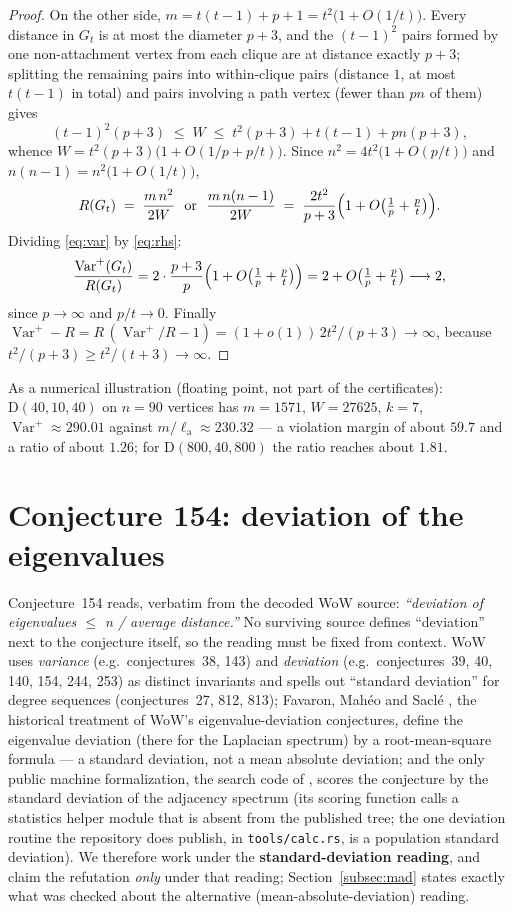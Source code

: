 \documentclass[11pt]{article}
\theoremstyle{remark}
\newcommand{\Varp}{\operatorname{Var}^{+}}
\newcommand{\la}{\ell_{\mathrm{a}}}
\newcommand{\D}{\mathrm{D}}
\begin{document}
\begin{proof}
On the other side, $m = t(t-1) + p + 1 = t^2\bigl(1 + O(1/t)\bigr)$. Every
distance in $G_t$ is at most the diameter $p + 3$, and the $(t-1)^2$ pairs
formed by one non-attachment vertex from each clique are at distance exactly
$p+3$; splitting the remaining pairs into within-clique pairs (distance $1$,
at most $t(t-1)$ in total) and pairs involving a path vertex (fewer than
$pn$ of them) gives
\[
(t-1)^2 (p+3) \;\le\; W \;\le\; t^2(p+3) + t(t-1) + pn(p+3),
\]
whence $W = t^2 (p+3)\bigl(1 + O(1/p + p/t)\bigr)$. Since
$n^2 = 4t^2\bigl(1 + O(p/t)\bigr)$ and $n(n-1) = n^2\bigl(1 + O(1/t)\bigr)$,
\begin{equation}\label{eq:rhs}
R(G_t) \;=\; \frac{m\,n^2}{2W} \ \text{ or } \ \frac{m\,n(n-1)}{2W}
\;=\; \frac{2t^2}{p+3}\Bigl(1 + O\bigl(\tfrac1p + \tfrac{p}{t}\bigr)\Bigr).
\end{equation}
Dividing \eqref{eq:var} by \eqref{eq:rhs}:
\[
\frac{\Varp(G_t)}{R(G_t)}
= 2\cdot\frac{p+3}{p}\Bigl(1 + O\bigl(\tfrac1p + \tfrac{p}{t}\bigr)\Bigr)
= 2 + O\bigl(\tfrac1p + \tfrac{p}{t}\bigr) \longrightarrow 2,
\]
since $p \to \infty$ and $p/t \to 0$. Finally
$\Varp - R = R\,(\Varp/R - 1) = (1 + o(1))\, 2t^2/(p+3) \to \infty$, because
$t^2/(p+3) \ge t^2/(t+3) \to \infty$.
\end{proof}

As a numerical illustration (floating point, not part of the certificates):
$\D(40,10,40)$ on $n = 90$ vertices has $m = 1571$, $W = 27625$, $k = 7$,
$\Varp \approx 290.01$ against $m/\la \approx 230.32$ --- a violation margin
of about $59.7$ and a ratio of about $1.26$; for
$\D(800,40,800)$ the ratio reaches about $1.81$.

\section{Conjecture 154: deviation of the eigenvalues}\label{sec:154}

Conjecture~154 reads, verbatim from the decoded WoW source:
\emph{``deviation of eigenvalues $\le$ n / average distance.''} No
surviving source defines ``deviation'' next to the conjecture itself, so the
reading must be fixed from context. WoW uses \emph{variance} (e.g.\
conjectures~38, 143) and \emph{deviation} (e.g.\ conjectures~39, 40, 140,
154, 244, 253) as distinct invariants and spells out ``standard deviation''
for degree sequences (conjectures~27, 812, 813); Favaron, Mah\'eo and
Sacl\'e \cite{FMS1993}, the historical treatment of WoW's
eigenvalue-deviation conjectures, define the eigenvalue deviation (there for
the Laplacian spectrum) by a
root-mean-square formula --- a standard deviation, not a mean absolute
deviation; and the only public machine formalization, the search code of
\cite{RoucairolCazenave2025}, scores the conjecture by the standard
deviation of the adjacency spectrum (its scoring function calls a statistics
helper module that is absent from the published tree; the one deviation
routine the repository does publish, in \texttt{tools/calc.rs}, is a
population standard deviation). We therefore work under the
\textbf{standard-deviation reading}, and claim the refutation \emph{only}
under that reading; Section~\ref{subsec:mad} states exactly what was checked
about the alternative (mean-absolute-deviation) reading.
\end{document}
